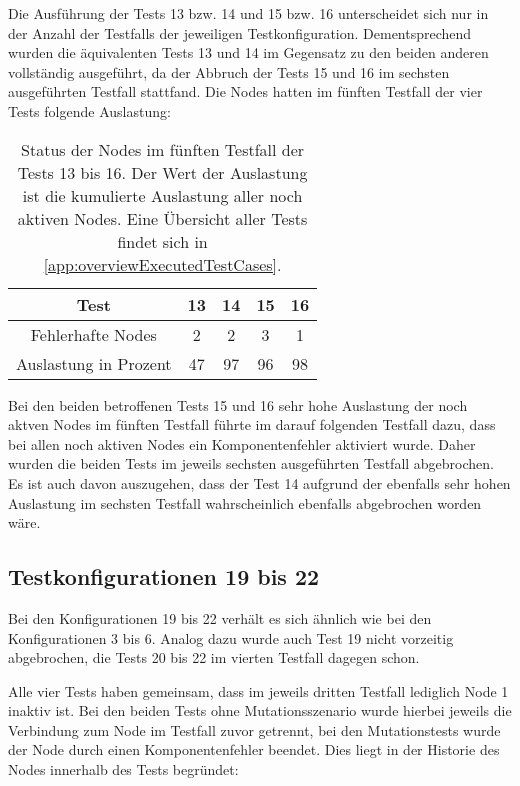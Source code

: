 Die Ausführung der \glspl{Test} 13 bzw. 14 und 15 bzw. 16 unterscheidet sich nur in der Anzahl der \glspl{Testfall} der jeweiligen Testkonfiguration.
Dementsprechend wurden die äquivalenten \glspl{Test} 13 und 14 im Gegensatz zu den beiden anderen vollständig ausgeführt, da der Abbruch der \glspl{Test} 15 und 16 im sechsten ausgeführten \gls{Testfall} stattfand.
Die Nodes hatten im fünften \gls{Testfall} der vier \glspl{Test} folgende Auslastung:

\begin{table}[h]
    \begin{tabular}{c|cccc}
    	        \gls{Test}          & 13 & 14 & 15 & 16 \\ \hline
    	  Fehlerhafte Nodes   & 2  & 2  & 3  & 1  \\
    	Auslastung in Prozent & 47 & 97 & 96 & 98
    \end{tabular}
    \caption[Status der Nodes im fünften \gls{Testfall} der \glspl{Test} 13 bis 16]
    {Status der Nodes im fünften \gls{Testfall} der \glspl{Test} 13 bis 16.
    Der Wert der Auslastung ist die kumulierte Auslastung aller noch aktiven Nodes.
    Eine Übersicht aller Tests findet sich in \cref{app:overviewExecutedTestCases}.}
    \label{tab:loadTests1316}
\end{table}

Bei den beiden betroffenen \glspl{Test} 15 und 16 sehr hohe Auslastung der noch aktven Nodes im fünften \gls{Testfall} führte im darauf folgenden \gls{Testfall} dazu, dass bei allen noch aktiven Nodes ein Komponentenfehler aktiviert wurde.
Daher wurden die beiden \glspl{Test} im jeweils sechsten ausgeführten \gls{Testfall} abgebrochen.
Es ist auch davon auszugehen, dass der \gls{Test} 14 aufgrund der ebenfalls sehr hohen Auslastung im sechsten \gls{Testfall} wahrscheinlich ebenfalls abgebrochen worden wäre.

\subsection{Testkonfigurationen 19 bis 22}
\label{subsec:noReconf1922}

Bei den Konfigurationen 19 bis 22 verhält es sich ähnlich wie bei den Konfigurationen 3 bis 6.
Analog dazu wurde auch \gls{Test} 19 nicht vorzeitig abgebrochen, die \glspl{Test} 20 bis 22 im vierten \gls{Testfall} dagegen schon.

Alle vier \glspl{Test} haben gemeinsam, dass im jeweils dritten \gls{Testfall} lediglich Node 1 inaktiv ist.
Bei den beiden \glspl{Test} ohne Mutationsszenario wurde hierbei jeweils die Verbindung zum Node im \gls{Testfall} zuvor getrennt, bei den Mutationstests wurde der Node durch einen Komponentenfehler beendet.
Dies liegt in der Historie des Nodes innerhalb des \glspl{Test} begründet:

